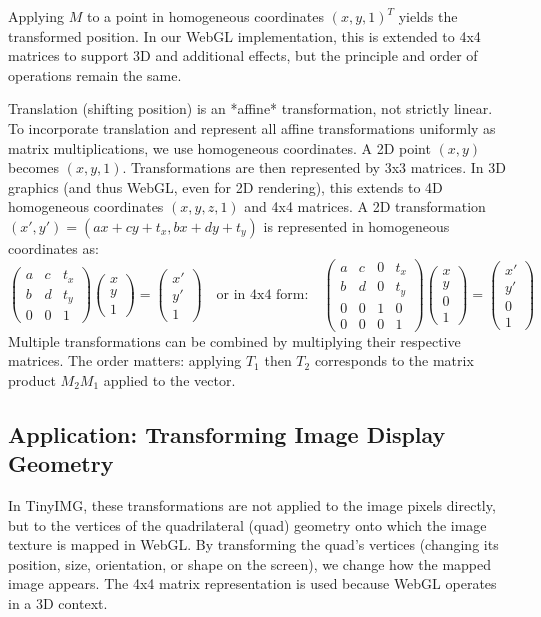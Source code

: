 \documentclass{article}
\begin{document}
Applying $M$ to a point in homogeneous coordinates $(x, y, 1)^T$ yields the transformed position.
In our WebGL implementation, this is extended to 4x4 matrices to support 3D and additional effects, but the principle and order of operations remain the same.


Translation (shifting position) is an *affine* transformation, not strictly linear. To incorporate translation and represent all affine transformations uniformly as matrix multiplications, we use homogeneous coordinates. A 2D point $(x, y)$ becomes $(x, y, 1)$. Transformations are then represented by 3x3 matrices. In 3D graphics (and thus WebGL, even for 2D rendering), this extends to 4D homogeneous coordinates $(x, y, z, 1)$ and 4x4 matrices. A 2D transformation $(x', y') = (ax+cy+t_x, bx+dy+t_y)$ is represented in homogeneous coordinates as:
$$
\begin{pmatrix} a & c & t_x \\ b & d & t_y \\ 0 & 0 & 1 \end{pmatrix}
\begin{pmatrix} x \\ y \\ 1 \end{pmatrix} =
\begin{pmatrix} x' \\ y' \\ 1 \end{pmatrix}
\quad \text{or in 4x4 form:} \quad
\begin{pmatrix} a & c & 0 & t_x \\ b & d & 0 & t_y \\ 0 & 0 & 1 & 0 \\ 0 & 0 & 0 & 1 \end{pmatrix}
\begin{pmatrix} x \\ y \\ 0 \\ 1 \end{pmatrix} =
\begin{pmatrix} x' \\ y' \\ 0 \\ 1 \end{pmatrix}
$$
Multiple transformations can be combined by multiplying their respective matrices. The order matters: applying $T_1$ then $T_2$ corresponds to the matrix product $M_2 M_1$ applied to the vector.

\subsection{Application: Transforming Image Display Geometry}
In TinyIMG, these transformations are not applied to the image pixels directly, but to the vertices of the quadrilateral (quad) geometry onto which the image texture is mapped in WebGL. By transforming the quad's vertices (changing its position, size, orientation, or shape on the screen), we change how the mapped image appears. The 4x4 matrix representation is used because WebGL operates in a 3D context.
\end{document}
